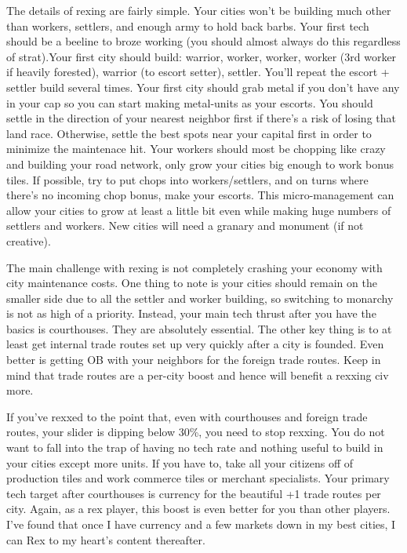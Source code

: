 \documentclass[10pt]{article}
\begin{document}
The details of rexing are fairly simple. Your cities won't be building
much other than workers, settlers, and enough army to hold back
barbs. Your first tech should be a beeline to broze working (you
should almost always do this regardless of strat).Your first city
should build: warrior, worker, worker, worker (3rd worker if heavily
forested), warrior (to escort setter), settler. You'll repeat the
escort + settler build several times. Your first city should grab
metal if you don't have any in your cap so you can start making
metal-units as your escorts. You should settle in the direction of
your nearest neighbor first if there's a risk of losing that land
race. Otherwise, settle the best spots near your capital first in
order to minimize the maintenace hit. Your workers should most be
chopping like crazy and building your road network, only grow your
cities big enough to work bonus tiles. If possible, try to put chops
into workers/settlers, and on turns where there's no incoming chop
bonus, make your escorts. This micro-management can allow your cities
to grow at least a little bit even while making huge numbers of
settlers and workers. New cities will need a granary and monument (if
not creative).

The main challenge with rexing is not completely crashing your economy
with city maintenance costs. One thing to note is your cities should
remain on the smaller side due to all the settler and worker building,
so switching to monarchy is not as high of a priority.  Instead, your
main tech thrust after you have the basics is courthouses. They are
absolutely essential. The other key thing is to at least get internal
trade routes set up very quickly after a city is founded. Even better
is getting OB with your neighbors for the foreign trade routes. Keep
in mind that trade routes are a per-city boost and hence will benefit
a rexxing civ more.

If you've rexxed to the point that, even with courthouses and foreign
trade routes, your slider is dipping below 30\%, you need to stop
rexxing. You do not want to fall into the trap of having no tech rate
and nothing useful to build in your cities except more units. If you
have to, take all your citizens off of production tiles and work
commerce tiles or merchant specialists.  Your primary tech target
after courthouses is currency for the beautiful +1 trade routes per
city. Again, as a rex player, this boost is even better for you than
other players. I've found that once I have currency and a few markets
down in my best cities, I can Rex to my heart's content thereafter.
\end{document}
